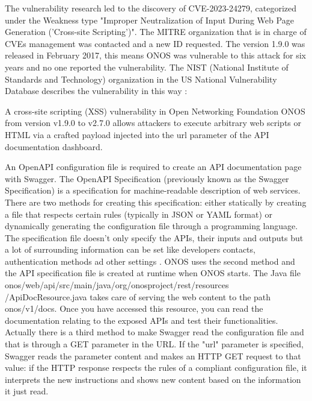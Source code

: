 \documentclass[a4paper,10pt]{memoir}
\begin{document}
The vulnerability research led to the discovery of CVE-2023-24279, categorized under the Weakness type "Improper Neutralization of Input During Web Page Generation ('Cross-site Scripting')". The MITRE organization that is in charge of CVEs management was contacted and a new ID requested. The version 1.9.0 was released in February 2017, this means ONOS was vulnerable to this attack for six years and no one reported the vulnerability. The NIST (National Institute of Standards and Technology) organization in the US National Vulnerability Database describes the vulnerability in this way \cite{CVE-2023-24279}:
\begin{quoting}[font=itshape, begintext={"}, endtext={"}]
A cross-site scripting (XSS) vulnerability in Open Networking Foundation ONOS from version v1.9.0 to v2.7.0 allows attackers to execute arbitrary web scripts or HTML via a crafted payload injected into the url parameter of the API documentation dashboard.
\end{quoting}
An OpenAPI configuration file is required to create an API documentation page with Swagger. The OpenAPI Specification (previously known as the Swagger Specification) is a specification for machine-readable description of web services. There are two methods for creating this specification: either statically by creating a file that respects certain rules (typically in JSON or YAML format) or dynamically generating the configuration file through a programming language. The specification file doesn't only specify the APIs, their inputs and outputs but a lot of surrounding information can be set like developers contacts, authentication methods ad other settings \cite{openapi}. ONOS uses the second method and the API specification file is created at runtime when ONOS starts. The Java file onos/web/api/src/main/java/org/onosproject/rest/resources
/ApiDocResource.java takes care of serving the web content to the path onos/v1/docs. Once you have accessed this resource, you can read the documentation relating to the exposed APIs and test their functionalities. Actually there is a third method to make Swagger read the configuration file and that is through a GET parameter in the URL. If the "url" parameter is specified, Swagger reads the parameter content and makes an HTTP GET request to that value: if the HTTP response respects the rules of a compliant configuration file, it interprets the new instructions and shows new content based on the information it just read.
\end{document}
